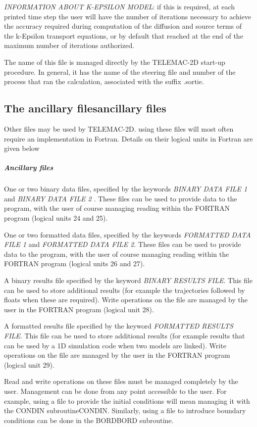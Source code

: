  \textit{INFORMATION ABOUT K-EPSILON MODEL}: if this is required, at each printed time step the user will have the number of iterations necessary to achieve the accuracy required during computation of the diffusion and source terms of the k-Epsilon transport equations, or by default that reached at the end of the maximum number of iterations authorized.

 The name of this file is managed directly by the TELEMAC-2D start-up procedure. In general, it has the name of the steering file and number of the process that ran the calculation, associated with the suffix .sortie.


\subsection{ The ancillary filesancillary files}

 Other files may be used by TELEMAC-2D. using these files will most often require an implementation in Fortran. Details on their logical units in Fortran are given below


\subparagraph{ Ancillary files}

 One or two binary data files, specified by the keywords \textit{BINARY DATA FILE 1 } and  \textit{BINARY DATA FILE 2 }. These files can be used to provide data to the program, with the user of course managing reading within the FORTRAN program (logical units 24 and 25).

 One or two formatted data files, specified by the keywords \textit{FORMATTED DATA FILE 1} and \textit{FORMATTED DATA FILE 2}.  These files can be used to provide data to the program, with the user of course managing reading within the FORTRAN program (logical units 26 and 27).

 A binary results file specified by the keyword \textit{BINARY RESULTS FILE}. This file can be used to store additional results (for example the trajectories followed by floats when these are required). Write operations on the file are managed by the user in the FORTRAN program (logical unit 28).

 A formatted results file specified by the keyword \textit{FORMATTED RESULTS FILE}. This file can be used to store additional results (for example results that can be used by a 1D simulation code when two models are linked). Write operations on the file are managed by the user in the FORTRAN program (logical unit 29).

 Read and write operations on these files must be managed completely by the user. Management can be done from any point accessible to the user. For example, using a file to provide the initial conditions will mean managing it with the CONDIN subroutineCONDIN. Similarly, using a file to introduce boundary conditions can be done in the BORDBORD subroutine.

